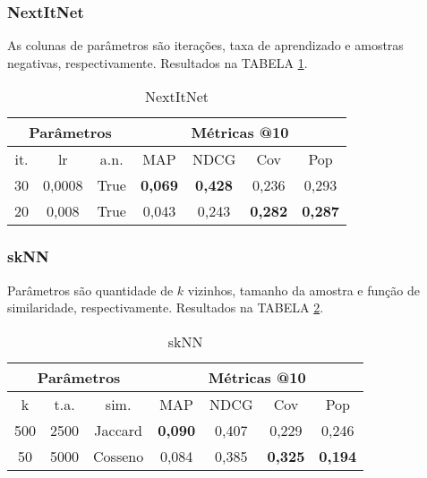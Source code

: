 \subsubsection{NextItNet}

As colunas de parâmetros são iterações, taxa de aprendizado e amostras
negativas, respectivamente. Resultados na TABELA \ref{opt:NextItNet_rem}.
\begin{table}[htbp]
  \centering
  \begin{tabular}{|c|c|c|c|c|c|c|}
    \hline
      \multicolumn{3}{|c|}{Parâmetros} & \multicolumn{4}{c|}{Métricas @10} \\
      \hline
      it. & lr & a.n. & MAP & NDCG & Cov & Pop \\
      \hline
      30 & 0,0008 & True & \textbf{0,069} & \textbf{0,428} & 0,236 & 0,293 \\
      \hline
      20 & 0,008 & True & 0,043 & 0,243 & \textbf{0,282} & \textbf{0,287} \\
      \hline
\end{tabular}
      \caption{NextItNet}
      \label{opt:NextItNet_rem}
\end{table}

\subsubsection{skNN}
Parâmetros são quantidade de $k$ vizinhos, tamanho da amostra e função de
similaridade, respectivamente. Resultados na TABELA \ref{opt:skNN_rem}.
\begin{table}[htbp]
  \centering
  \begin{tabular}{|c|c|c|c|c|c|c|}
    \hline
      \multicolumn{3}{|c|}{Parâmetros} & \multicolumn{4}{c|}{Métricas @10} \\
      \hline
      k & t.a. & sim. & MAP & NDCG & Cov & Pop \\
      \hline
      500 & 2500 & Jaccard & \textbf{0,090} & 0,407 & 0,229 & 0,246 \\
      \hline
      50 & 5000 & Cosseno & 0,084 & 0,385 & \textbf{0,325} & \textbf{0,194} \\
      \hline
      \end{tabular}
      \caption{skNN}
      \label{opt:skNN_rem}
\end{table}

